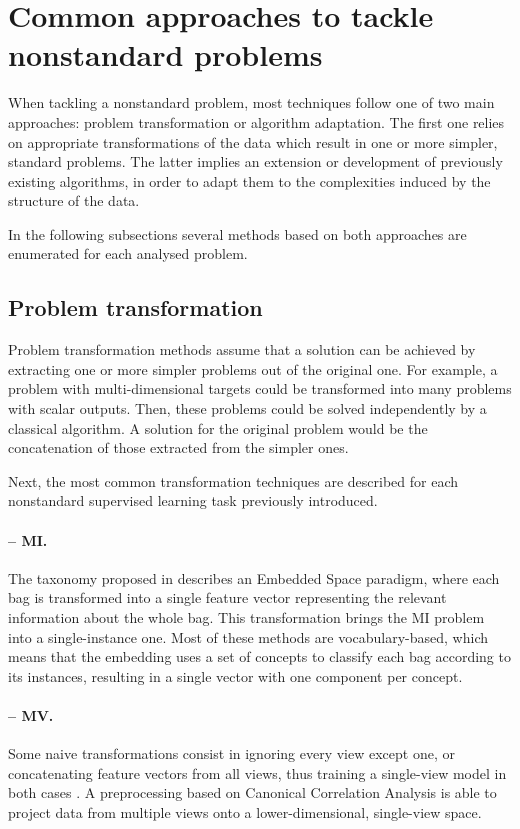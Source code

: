 \documentclass[
	fontsize=11pt, %
	twoside=false, %
	open=any, %
	secnumdepth=1, %
]{kaobook}
\begin{document}
\section{Common approaches to tackle nonstandard problems}
\label{sec:algorithms}

When tackling a nonstandard problem, most techniques follow one of two main approaches: problem transformation or algorithm adaptation. The first one relies on appropriate transformations of the data which result in one or more simpler, standard problems. The latter implies an extension or development of previously existing algorithms, in order to adapt them to the complexities induced by the structure of the data.

In the following subsections several methods based on both approaches are enumerated for each analysed problem.

\subsection{Problem transformation}

Problem transformation methods assume that a solution can be achieved by extracting one or more simpler problems out of the original one. For example, a problem with multi-dimensional targets could be transformed into many problems with scalar outputs. Then, these problems could be solved independently by a classical algorithm. A solution for the original problem would be the concatenation of those extracted from the simpler ones.

Next, the most common transformation techniques are described for each nonstandard supervised learning task previously introduced.


\paragraph{-- MI.} 
The taxonomy proposed in \cite{mic-taxonomy} describes an Embedded Space paradigm, where each bag is transformed into a single feature vector representing the relevant information about the whole bag. This transformation brings the MI problem into a single-instance one. Most of these methods are voca\-bulary-based, which means that the embedding uses a set of concepts to classify each bag according to its instances, resulting in a single vector with one component per concept.

\paragraph{-- MV.} Some naive transformations consist in ignoring every view except one, or concatenating feature vectors from all views, thus training a single-view model in both cases \cite{mv-spectral}. A preprocessing based on Canonical Correlation Analysis \cite{mv-cca} is able to project data from multiple views onto a lower-dimensional, single-view space.
\end{document}
